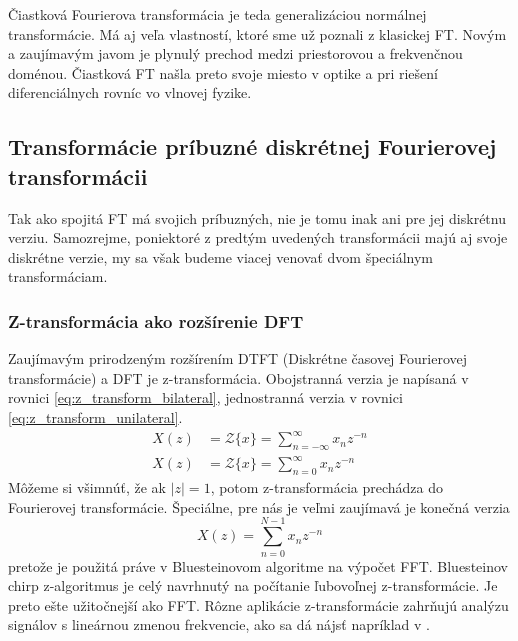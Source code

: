 Čiastková Fourierova transformácia je teda generalizáciou normálnej
transformácie. Má aj veľa vlastností, ktoré sme už poznali z klasickej
FT. Novým a zaujímavým javom je plynulý prechod medzi
priestorovou a frekvenčnou doménou. Čiastková FT našla preto svoje
miesto v optike a pri riešení diferenciálnych
rovníc vo vlnovej fyzike.

\subsection{Transformácie príbuzné diskrétnej Fourierovej
transformácii}
Tak ako spojitá FT má svojich príbuzných, nie je tomu inak ani pre jej
diskrétnu verziu. Samozrejme, poniektoré z predtým uvedených
transformácii majú aj svoje diskrétne verzie, my sa však budeme viacej
venovať dvom špeciálnym transformáciam.

\subsubsection{Z-transformácia ako rozšírenie DFT}
Zaujímavým prirodzeným rozšírením DTFT (Diskrétne časovej Fourierovej
transformácie) a DFT je z-transformácia. Obojstranná verzia je
napísaná v rovnici \eqref{eq:z_transform_bilateral}, jednostranná verzia
v rovnici \eqref{eq:z_transform_unilateral}.
\begin{align}
    \label{eq:z_transform_bilateral}
    X(z) &= \mathcal{Z}\{x\} = \sum_{n=-\infty}^{\infty} x_n z^{-n} \\
    \label{eq:z_transform_unilateral}
    X(z) &= \mathcal{Z}\{x\} = \sum_{n=0}^{\infty} x_n z^{-n}
\end{align}
Môžeme si všimnúť, že ak $|z|=1$, potom z-transformácia prechádza do
Fourierovej transformácie.
Špeciálne, pre nás je veľmi zaujímavá je konečná verzia
\begin{equation*}
 X(z) = \sum_{n=0}^{N-1} x_n z^{-n}
\end{equation*}
pretože je použitá práve v Bluesteinovom algoritme na výpočet FFT.
Bluesteinov chirp z-algoritmus je celý navrhnutý na počítanie
ľubovoľnej z-transformácie. Je preto ešte užitočnejší ako FFT. Rôzne
aplikácie z-transformácie zahrňujú analýzu signálov s lineárnou zmenou
frekvencie, ako sa dá nájsť napríklad v \cite{nasa}.

